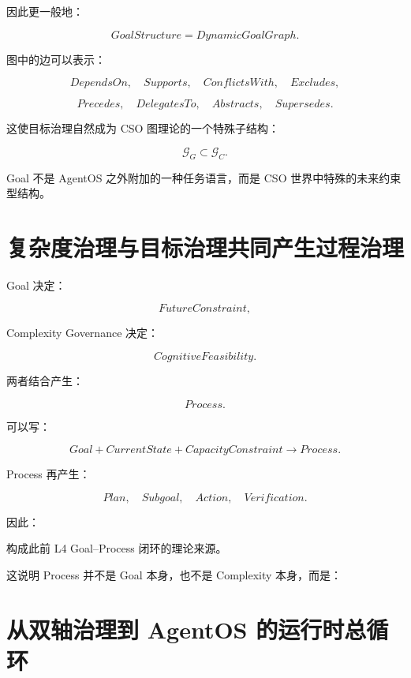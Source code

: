 因此更一般地：

\[
\boxed{
GoalStructure
=
DynamicGoalGraph.
}
\]

图中的边可以表示：

\[
DependsOn,
\quad
Supports,
\quad
ConflictsWith,
\quad
Excludes,
\]

\[
Precedes,
\quad
DelegatesTo,
\quad
Abstracts,
\quad
Supersedes.
\]

这使目标治理自然成为 CSO 图理论的一个特殊子结构：

\[
\boxed{
\mathcal G_G
\subset
\mathcal G_C.
}
\]

Goal 不是 AgentOS 之外附加的一种任务语言，而是 CSO 世界中特殊的未来约束型结构。


\section{复杂度治理与目标治理共同产生过程治理}

Goal 决定：

\[
FutureConstraint,
\]

Complexity Governance 决定：

\[
CognitiveFeasibility.
\]

两者结合产生：

\[
\boxed{
Process.
}
\]

可以写：

\[
Goal
+
CurrentState
+
CapacityConstraint
\rightarrow
Process.
\]

Process 再产生：

\[
Plan,
\quad
Subgoal,
\quad
Action,
\quad
Verification.
\]

因此：

\begin{statementbox}
\centering
{}
\end{statementbox}

构成此前 L4 Goal--Process 闭环的理论来源。

这说明 Process 并不是 Goal 本身，也不是 Complexity 本身，而是：

\begin{statementbox}
\centering
{}
\end{statementbox}


\section{从双轴治理到 AgentOS 的运行时总循环}


